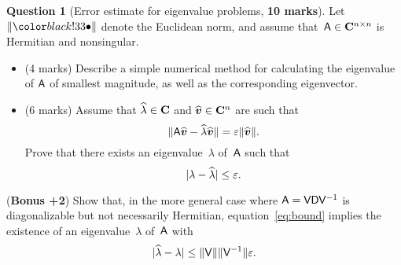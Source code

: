 \documentclass[11pt]{article}
\theoremstyle{definition}
\newtheorem{question}{Question}
\begin{document}


\newpage
\begin{question}
    [Error estimate for eigenvalue problems, \textbf{10 marks}]
    Let $\norm{\placeholder}$ denote the Euclidean norm,
    and assume that~$\mathsf A \in \mathbf C^{n \times n}$ is Hermitian and nonsingular.

    \begin{itemize}
        \item
            (4 marks)
            Describe a simple numerical method for calculating the eigenvalue of $\mathsf A$ of smallest magnitude,
            as well as the corresponding eigenvector.


        \item
            (6 marks)
            Assume that $\widehat \lambda \in \mathbf C$ and $\widehat{\mathbf{\boldsymbol{v}}} \in \mathbf C^n$ are such that
            \begin{equation}
                \label{eq:bound}
                \lVert\mathsf A \widehat{\mathbf{\boldsymbol{v}}} - \widehat{\lambda} \widehat{\mathbf{\boldsymbol{v}}}\rVert = \varepsilon \lVert\widehat {\mathbf{\boldsymbol{v}}}\rVert.
            \end{equation}
            Prove that there exists an eigenvalue~$\lambda$ of~$\mathsf A$ such that
            \[
                \lvert\lambda - \widehat \lambda\rvert \leq \varepsilon.
            \]
    \end{itemize}

    \noindent (\textbf{Bonus +2}) Show that, in the more general case where $\mathsf A = \mathsf V \mathsf D \mathsf V^{-1}$ is diagonalizable but not necessarily Hermitian,
    equation~\eqref{eq:bound} implies the existence of an eigenvalue~$\lambda$ of~$\mathsf A$ with
    \[
        \lvert\widehat \lambda - \lambda\rvert \leq \lVert\mathsf V\rVert \lVert\mathsf V^{-1}\rVert \varepsilon.
    \]

\end{question}
\end{document}
